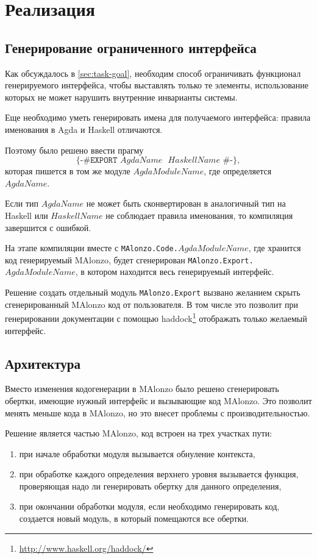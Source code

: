 \section{Реализация}

\subsection{Генерирование ограниченного интерфейса}

Как обсуждалось в \ref{sec:task-goal}, необходим способ ограничивать
функционал генерируемого интерфейса, чтобы выставлять только те элементы,
использование которых не может нарушить внутренние инварианты системы.

Еще необходимо уметь генерировать имена для получаемого интерфейса:
правила именования в Agda и Haskell отличаются.

Поэтому было решено ввести прагму
\[
\texttt{\{-\# EXPORT \(AgdaName\) \(HaskellName\) \#-\}},
\]
которая пишется в том же модуле \(AgdaModuleName\), где определяется \(AgdaName\).

Если тип \(AgdaName\) не может быть сконвертирован в аналогичный тип на Haskell
или \(HaskellName\) не соблюдает правила именования, то компиляция завершится с ошибкой.

На этапе компиляции вместе с \texttt{MAlonzo.Code.\(AgdaModuleName\)}, где хранится
код генерируемый MAlonzo, будет сгенерирован \texttt{MAlonzo.Export.\(AgdaModuleName\)},
в котором находится весь генерируемый интерфейс.

Решение создать отдельный модуль \texttt{MAlonzo.Export} вызвано желанием скрыть
сгенерированный MAlonzo код от пользователя. В том числе это позволит
при генерировании документации с помощью haddock\footnote{\url{http://www.haskell.org/haddock/}}
отображать только желаемый интерфейс.

\subsection{Архитектура}

Вместо изменения кодогенерации в MAlonzo было решено сгенерировать
обертки, имеющие нужный интерфейс и вызывающие код MAlonzo. Это
позволит менять меньше кода в MAlonzo, но это внесет проблемы с производительностью.

Решение является частью MAlonzo, код встроен на трех участках пути:
\begin{enumerate}
\item при начале обработки модуля вызывается обнуление контекста,
\item при обработке каждого определения верхнего уровня вызывается
      функция, проверяющая надо ли генерировать обертку для данного определения,
\item при окончании обработки модуля, если необходимо генерировать код, создается
      новый модуль, в который помещаются все обертки.
\end{enumerate}

